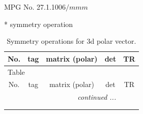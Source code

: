\documentclass[fleqn,8pt]{jsarticle}
\begin{document}
\setcounter{MaxMatrixCols}{32}

\renewcommand{\tablename}{Table~}
\renewcommand{\figurename}{Figure~}
\begin{center}
\LARGE
MPG No. 27.1.100\quad$6/mmm$
\end{center}
* symmetry operation
\renewcommand{\arraystretch}{1.3}
\begin{longtable}{ccccc}
\caption{Symmetry operations for 3d polar vector.}
 \\
 \hline \hline
No. & tag & matrix (polar) & det & TR \\ \hline \endfirsthead

\multicolumn{4}{l}{\tablename\ \thetable{}} \\
 \hline \hline
No. & tag & matrix (polar) & det & TR \\ \hline \endhead

 \hline \hline
\multicolumn{4}{r}{\footnotesize\it continued ...} \\ \endfoot

 \hline \hline
\multicolumn{4}{r}{} \\ \endlastfoot


\end{longtable}
\end{document}
